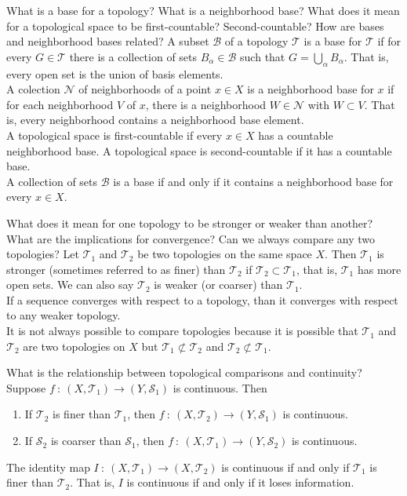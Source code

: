 \documentclass[avery5388,grid,frame]{flashcards}
\newcommand{\f}[3]{#1\ :\ #2 \rightarrow #3}
\def\topo{\mathcal{T}}
\def\sopo{\mathcal{S}}
\begin{document}
\begin{flashcard}
    {What is a base for a topology?  What is a neighborhood base?  What does it mean for a topological space to be first-countable?  Second-countable?  How are bases and neighborhood bases related?}
    A subset $\mathcal{B}$ of a topology $\topo$ is a base for $\topo$ if for every $G \in \topo$ there is a collection of sets $B_\alpha \in \mathcal{B}$ such that $G = \bigcup_\alpha B_\alpha$.  That is, every open set is the union of basis elements. \\

    A colection $\mathcal{N}$ of neighborhoods of a point $x \in X$ is a neighborhood base for $x$ if for each neighborhood $V$ of $x$, there is a neighborhood $W \in \mathcal{N}$ with $W \subset V$.  That is, every neighborhood contains a neighborhood base element. \\

    A topological space is first-countable if every $x \in X$ has a countable neighborhood base.  A topological space is second-countable if it has a countable base. \\

    A collection of sets $\mathcal{B}$ is a base if and only if it contains a neighborhood base for every $x \in X$.
\end{flashcard}

\begin{flashcard}
    {What does it mean for one topology to be stronger or weaker than another?  What are the implications for convergence?  Can we always compare any two topologies?}
    Let $\topo_1$ and $\topo_2$ be two topologies on the same space $X$.  Then $\topo_1$ is stronger (sometimes referred to as finer) than $\topo_2$ if $\topo_2 \subset \topo_1$, that is, $\topo_1$ has more open sets.  We can also say $\topo_2$ is weaker (or coarser) than $\topo_1$. \\

    If a sequence converges with respect to a topology, than it converges with respect to any weaker topology. \\

    It is not always possible to compare topologies because it is possible that $\topo_1$ and $\topo_2$ are two topologies on $X$ but $\topo_1 \not\subset \topo_2$ and $\topo_2 \not\subset \topo_1$.
\end{flashcard}

\begin{flashcard}
    {What is the relationship between topological comparisons and continuity?}
    Suppose $\f{f}{(X,\topo_1)}{(Y,\sopo_1)}$ is continuous.  Then
    \begin{enumerate}[\ (a)]
        \item If $\topo_2$ is finer than $\topo_1$, then $\f{f}{(X,\topo_2)}{(Y,\sopo_1)}$ is continuous.
        \item If $\sopo_2$ is coarser than $\sopo_1$, then $\f{f}{(X,\topo_1)}{(Y,\sopo_2)}$ is continuous.
    \end{enumerate}

    The identity map $\f{I}{(X,\topo_1)}{(X,\topo_2)}$ is continuous if and only if $\topo_1$ is finer than $\topo_2$.  That is, $I$ is continuous if and only if it loses information.
\end{flashcard}
\end{document}
